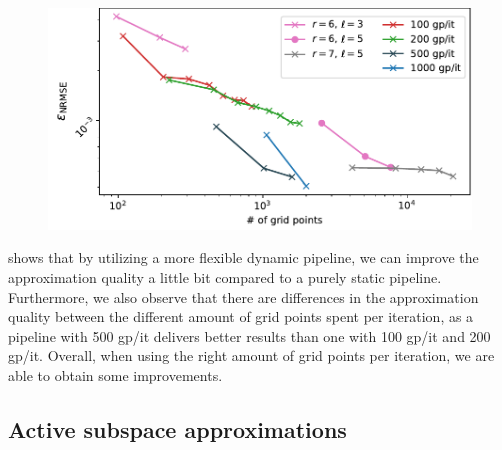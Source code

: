 \documentclass[
  a4paper,  %
  twoside,  %
  bibliography=totoc,
  headsepline,
  cleardoublepage=empty,
  parskip=half,
  draft=false
]{scrbook}
\begin{document}
\begin{mdframed}[style=style]
\begin{figure}[H]
\vspace{-2mm}
\includegraphics[width=\textwidth]{graphics/ww_dynamic}\vspace{-4mm}
\delimit
{}
\label{fig:ww_dyn}
\end{figure}
\end{mdframed}
%
 shows that by utilizing a more flexible dynamic pipeline, we can improve the approximation quality a little bit compared to a purely static pipeline.
Furthermore, we also observe that there are differences in the approximation quality between the different amount of grid points spent per iteration, as a pipeline with 500 gp/it delivers better results than one with 100 gp/it and 200 gp/it.
Overall, when using the right amount of grid points per iteration, we are able to obtain some improvements.

\subsection{Active subspace approximations}
\end{document}
